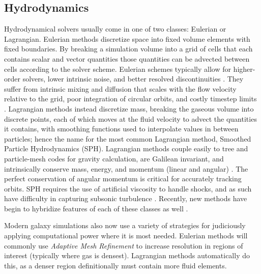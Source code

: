 \subsection{Hydrodynamics}
Hydrodynamical solvers usually come in one of two classes: Eulerian or
Lagrangian.  Eulerian methods discretize space into fixed volume elements with
fixed boundaries.  By breaking a simulation volume into a grid of cells that
each contains scalar and vector quantities those quantities can be advected
between cells according to the solver scheme.  Eulerian schemes typically allow
for higher-order solvers, lower intrinsic noise, and better resolved
discontinuities \citep{Teyssier2002,Stone2008,Bryan2014}.  They suffer from
intrinsic mixing and diffusion that scales with the flow velocity relative to
the grid, poor integration of circular orbits, and costly timestep limits
\citep{Agertz2007,Tasker2008}.  Lagrangian methods instead discretize mass,
breaking the gaseous volume into discrete points, each of which moves at the
fluid velocity to advect the quantities it contains, with smoothing functions
used to interpolate values in between particles; hence the name for the most
common Lagrangian method, Smoothed Particle Hydrodynamics (SPH).  Lagrangian
methods couple easily to tree and particle-mesh codes for gravity calculation,
are Galilean invariant, and intrinsically conserve mass, energy, and momentum
(linear and angular) \citep{Katz1996,Wadsley2004,Springel2005}.  The perfect
conservation of angular momentum is critical for accurately tracking orbits. SPH
requires the use of artificial viscosity to handle shocks, and as such have
difficulty in capturing subsonic turbulence \citep{Bauer2012}. Recently, new
methods have begin to hybridize features of each of these classes as well
\citep{Springel2010,Hopkins2015}. 

Modern galaxy simulations also now use a variety of strategies for judiciously
applying computational power where it is most needed.  Eulerian methods will
commonly use \textit{Adaptive Mesh Refinement} to increase resolution in regions
of interest (typically where gas is densest).  Lagrangian methods automatically
do this, as a denser region definitionally must contain more fluid elements.  


